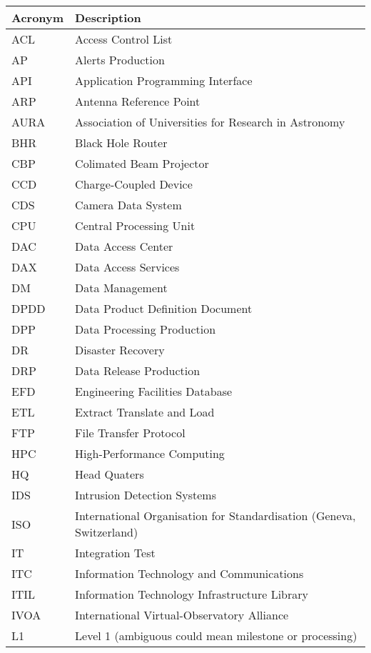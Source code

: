 \addtocounter{table}{-1}
\begin{longtable}{|l|p{}|}\hline
\textbf{Acronym} & \textbf{Description}  \\\hline

ACL & Access Control List \\\hline
AP & Alerts Production \\\hline
API & Application Programming Interface \\\hline
ARP & Antenna Reference Point \\\hline
AURA & Association of Universities for Research in Astronomy \\\hline
BHR & Black Hole Router \\\hline
CBP & Colimated Beam Projector \\\hline
CCD & Charge-Coupled Device \\\hline
CDS & Camera Data System \\\hline
CPU & Central Processing Unit \\\hline
DAC & Data Access Center \\\hline
DAX & Data Access Services \\\hline
DM & Data Management \\\hline
DPDD & Data Product Definition Document \\\hline
DPP & Data Processing Production \\\hline
DR & Disaster Recovery \\\hline
DRP & Data Release Production \\\hline
EFD & Engineering Facilities Database \\\hline
ETL & Extract Translate and Load \\\hline
FTP & File Transfer Protocol \\\hline
HPC & High-Performance Computing \\\hline
HQ & Head Quaters \\\hline
IDS & Intrusion Detection Systems \\\hline
ISO & International Organisation for Standardisation (Geneva, Switzerland) \\\hline
IT & Integration Test \\\hline
ITC & Information Technology and Communications \\\hline
ITIL & Information Technology Infrastructure Library \\\hline
IVOA & International Virtual-Observatory Alliance \\\hline
L1 & Level 1 (ambiguous could mean milestone or processing) \\\hline

\end{longtable}
